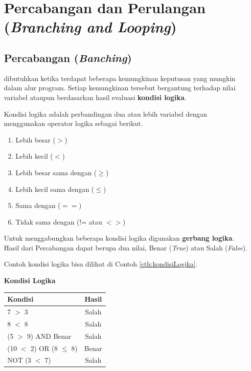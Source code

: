 \chapter{Percabangan dan Perulangan (\textit{Branching and Looping})}

\section{Percabangan (\textit{Banching})}
 dibutuhkan ketika terdapat beberapa kemungkinan keputusan yang mungkin dalam alur program. Setiap kemungkinan tersebut bergantung terhadap nilai variabel ataupun berdasarkan hasil evaluasi \textbf{kondisi logika}. 

Kondisi logika adalah perbandingan dua atau lebih variabel dengan menggunakan operator logika sebagai berikut.
\begin{enumerate}
	\item Lebih besar ($>$)
	\item Lebih kecil ($<$)
	\item Lebih besar sama dengan ($\geq$)
	\item Lebih kecil sama dengan ($\leq$)
	\item Sama dengan ($==$)
	\item Tidak sama dengan (!= atau $<>$)
\end{enumerate}

Untuk menggabungkan beberapa kondisi logika digunakan \textbf{gerbang logika}.\\
Hasil dari Percabangan dapat berupa dua nilai, Benar (\textit{True}) atau Salah (\textit{False}).

Contoh kondisi logika bisa dilihat di Contoh \ref{cth:kondisiLogika}.
\begin{contoh}
\label{cth:kondisiLogika}
\textbf{Kondisi Logika}\\

\begin{table}
	\centering
	\begin{tabular}{  l  c  }
	\hline
	Kondisi & Hasil \\
	\hline
	7 $>$ 3 & Salah \\
	8 $<$ 8 & Salah \\
	(5 $>$ 9) AND Benar & Salah \\
	(10 $<$ 2) OR (8 $\leq$ 8) & Benar \\
	NOT (3 $<$ 7) & Salah \\
	\hline
	\end{tabular}
\label{table:tabellogika}
\end{table}
\end{contoh}



